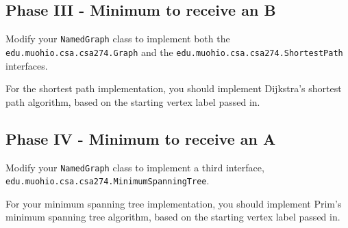 \documentclass[11pt]{article}
\begin{document}
\subsection*{Phase III - Minimum to receive an B}
\par
Modify your {\tt NamedGraph} class to implement both the {\tt edu.muohio.csa.csa274.Graph} and the {\tt edu.muohio.csa.csa274.ShortestPath} interfaces.
\par
For the shortest path implementation, you should implement Dijkstra's shortest path algorithm, based on the starting vertex label passed in.  

\subsection*{Phase IV - Minimum to receive an A}
\par
Modify your {\tt NamedGraph} class to implement a third interface, {\tt edu.muohio.csa.csa274.MinimumSpanningTree}.  
\par
For your minimum spanning tree implementation, you should implement Prim's minimum spanning tree algorithm, based on the starting vertex label passed in.
\end{document}
